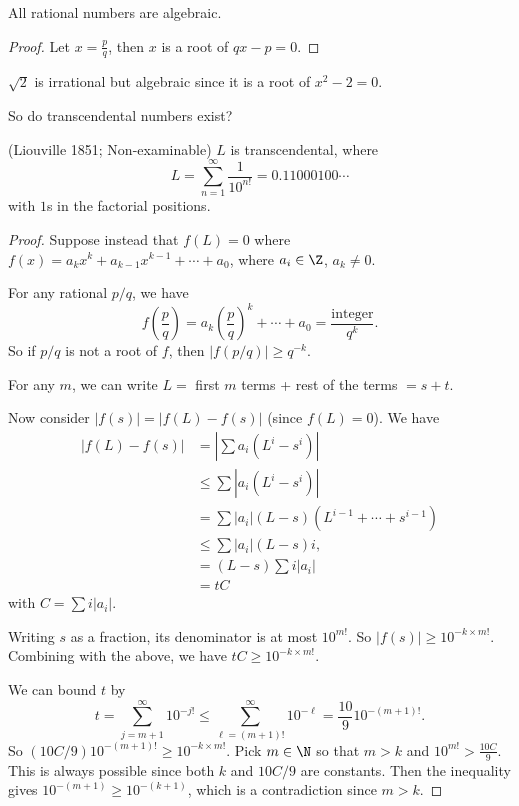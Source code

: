 \documentclass[a4paper]{article}
\begin{document}
\begin{prop}
  All rational numbers are algebraic.
\end{prop}

\begin{proof}
  Let $x = \frac{p}{q}$, then $x$ is a root of $qx - p = 0$.
\end{proof}

\begin{eg}
  $\sqrt{2}$ is irrational but algebraic since it is a root of $x^2 - 2 = 0$.
\end{eg}

So do transcendental numbers exist?
\begin{thm}
  (Liouville 1851; Non-examinable) $L$ is transcendental, where
  \[
    L = \sum_{n = 1}^\infty \frac{1}{10^{n!}} = 0.11000100\cdots
  \]
  with $1$s in the factorial positions.
\end{thm}

\begin{proof}
  Suppose instead that $f(L) = 0$ where $f(x) = a_kx^k + a_{k -1}x^{k - 1} + \cdots + a_0$, where $a_i\in \Z$, $a_k\not= 0$.

  For any rational $p/q$, we have
  \[
    f\left(\frac{p}{q}\right) = a_k\left(\frac{p}{q}\right)^k + \cdots + a_0 = \frac{\text{integer}}{q^k}.
  \]
  So if $p/q$ is not a root of $f$, then $|f(p/q)| \geq q^{-k}$.

  For any $m$, we can write $L = $ first $m$ terms + rest of the terms $ = s + t$.

  Now consider $|f(s)| = |f(L) - f(s)|$ (since $f(L) = 0$). We have
  \begin{align*}
    |f(L) - f(s)| &= \left|\sum a_i(L^i - s^i)\right|\\
    &\leq \sum |a_i(L^i - s^i)|\\
    &= \sum |a_i|(L - s)(L^{i - 1} + \cdots + s^{i - 1})\\
    &\leq \sum |a_i|(L - s)i,\\
    &= (L - s)\sum i|a_i|\\
    &= tC
  \end{align*}
  with $C = \sum i|a_i|$.

  Writing $s$ as a fraction, its denominator is at most $10^{m!}$. So $|f(s)| \geq 10^{-k\times m!}$. Combining with the above, we have $tC \geq 10^{-k\times m!}$.

  We can bound $t$ by
  \[
    t = \sum_{j = m + 1}^\infty 10^{-j!} \leq \sum_{\ell = (m + 1)!}^\infty 10^{-\ell} = \frac{10}{9}10^{-(m + 1)!}.
  \]
  So $(10C/9)10^{-(m + 1)!} \geq 10^{-k\times m!}$. Pick $m\in \N$ so that $m > k$ and $10^{m!} > \frac{10C}{9}$. This is always possible since both $k$ and $10C/9$ are constants. Then the inequality gives $10^{-(m + 1)} \geq 10^{-(k + 1)}$, which is a contradiction since $m > k$.
\end{proof}
\end{document}
